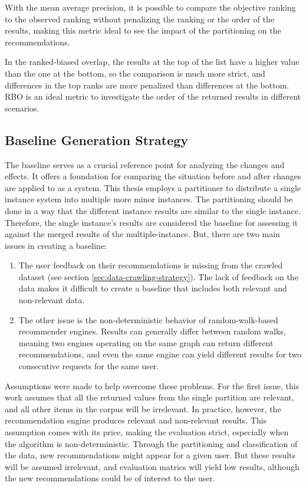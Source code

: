 With the mean average precision, it is possible to compare the objective ranking to the observed ranking without penalizing the ranking or the order of the results, making this metric ideal to see the impact of the partitioning on the recommendations.


In the ranked-biased overlap, the results at the top of the list have a higher value than the one at the bottom, so the comparison is much more strict, and differences in the top ranks are more penalized than differences at the bottom. RBO is an ideal metric to investigate the order of the returned results in different scenarios.


\subsection{Baseline Generation Strategy}
\label{subsec:baseline-generation}
The baseline serves as a crucial reference point for analyzing the changes and effects. It offers a foundation for comparing the situation before and after changes are applied to as a system. This thesis employs a partitioner to distribute a single instance system into multiple more minor instances. The partitioning should be done in a way that the different instance results are similar to the single instance. Therefore, the single instance's results are considered the baseline for assessing it against the merged results of the multiple-instance. But, there are two main issues in creating a baseline:

\begin{enumerate}
    \item The user feedback on their recommendations is missing from the crawled dataset (see section \ref{sec:data-crawling-strategy}). The lack of feedback on the data makes it difficult to create a baseline that includes both relevant and non-relevant data.
    
    \item The other issue is the non-deterministic behavior of random-walk-based recommender engines. Results can generally differ between random walks, meaning two engines operating on the same graph can return different recommendations, and even the same engine can yield different results for two consecutive requests for the same user.
\end{enumerate}

Assumptions were made to help overcome these problems. For the first issue, this work assumes that all the returned values from the single partition are relevant, and all other items in the corpus will be irrelevant. In practice, however, the recommendation engine produces relevant and non-relevant results. This assumption comes with its price, making the evaluation strict, especially when the algorithm is non-deterministic. Through the partitioning and classification of the data, new recommendations might appear for a given user. But these results will be assumed irrelevant, and evaluation matrics will yield low results, although the new recommendations could be of interest to the user.


